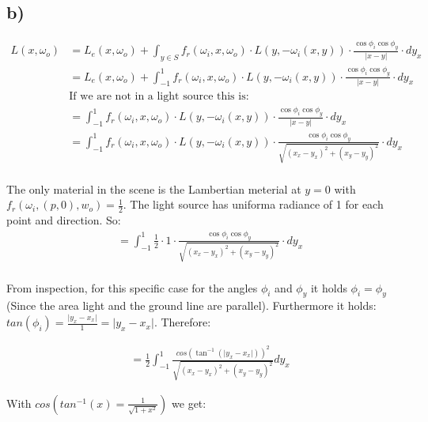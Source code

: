 \documentclass[a4paper]{scrartcl}
\begin{document}
  

\subsection*{b)}

\begin{align*}
  L(x, \omega_o) &= L_e(x, \omega_o) + \int_{y \in S} f_r(\omega_i, x, \omega_o) \cdot L(y, -\omega_i(x,y)) \cdot \frac{\cos \phi_i \cos \phi_y}{\lvert x - y \rvert} \cdot d y_x \\
  &= L_e(x, \omega_o) + \int_{-1}^{1} f_r(\omega_i, x, \omega_o) \cdot L(y, -\omega_i(x,y)) \cdot \frac{\cos \phi_i \cos \phi_y}{\lvert x - y \rvert} \cdot d y_x \\
  & \text{If we are not in a light source this is: } \\
  &= \int_{-1}^{1} f_r(\omega_i, x, \omega_o) \cdot L(y, -\omega_i(x,y)) \cdot \frac{\cos \phi_i \cos \phi_y}{\lvert x - y \rvert} \cdot d y_x \\
  &= \int_{-1}^{1} f_r(\omega_i, x, \omega_o) \cdot L(y, -\omega_i(x,y)) \cdot \frac{\cos \phi_i \cos \phi_y}{\sqrt{(x_x - y_x)^2 + (x_y - y_y)^2}} \cdot d y_x \\
\end{align*}

The only material in the scene is the Lambertian meterial at $y=0$ with $f_r(\omega_i, (p,0), w_o) = \frac{1}{2}$. The light source has uniforma radiance of 1 for each point and direction. So:
\begin{align*}
  &= \int_{-1}^{1} \frac{1}{2} \cdot 1 \cdot \frac{\cos \phi_i \cos \phi_y}{\sqrt{(x_x - y_x)^2 + (x_y - y_y)^2}} \cdot d y_x \\
\end{align*}

From inspection, for this specific case for the angles $\phi_i$ and $\phi_y$ it holds $\phi_i = \phi_y$ (Since the area light and the ground line are parallel). 
Furthermore it holds: $tan(\phi_i) = \frac{\lvert y_x - x_x \rvert}{1} = \lvert y_x - x_x \rvert$. Therefore:

\begin{align*}
  &= \frac{1}{2} \int_{-1}^{1} \frac{cos(\tan^{-1}(\lvert y_x - x_x \rvert))^2}{\sqrt{(x_x - y_x)^2 + (x_y - y_y)^2}} d y_x
\end{align*}

With $cos(tan^{-1}(x) = \frac{1}{\sqrt{1 + x^2}})$ we get:
\end{document}
